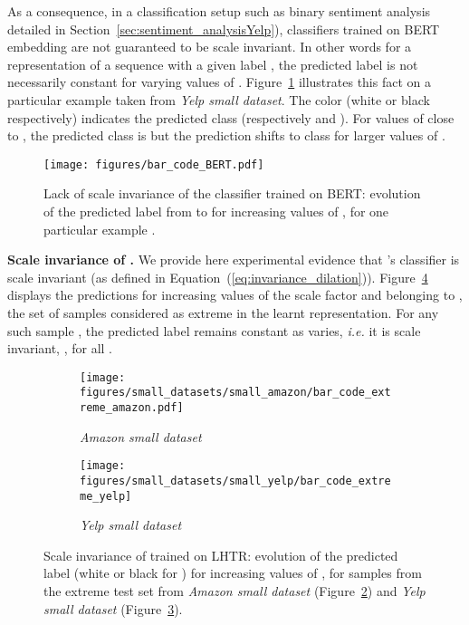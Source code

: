 As a consequence, 
in a classification setup such as binary sentiment analysis  detailed in Section~\ref{sec:sentiment_analysisYelp}), classifiers trained on BERT embedding are not guaranteed to be scale invariant. In other words for a representation  of a sequence  with a given label , the predicted label  is not necessarily constant for varying values of .
Figure~\ref{fig:barcode_bert} illustrates this fact on a particular example taken from \textit{Yelp small dataset}. The color (white or black respectively) indicates the predicted class (respectively  and ). For values of  close to , the predicted class is  but the prediction shifts to class   for larger values of . 
\begin{figure}[h]
    \centering
    \texttt{[image: figures/bar\_code\_BERT.pdf]}
    \caption{Lack of scale invariance of the classifier trained on BERT: evolution of the predicted label  from  to  for increasing values of , for one particular example .}
    \label{fig:barcode_bert}
\end{figure}{}

\textbf{Scale invariance of \HTalgo.} We provide here experimental evidence that \HTalgo's classifier  is scale invariant (as defined in Equation~(\ref{eq:invariance_dilation})). Figure~\ref{fig:barcodes_lhtr} displays the predictions  for increasing values of the scale factor   and  belonging to , the set of samples considered as extreme in the learnt representation. For any such sample ,
the predicted label remains constant as  varies, \emph{i.e.} it is  scale invariant, , for all . 
\begin{figure}[ht]
\centering
\begin{subfigure}[t]{0.45\textwidth}
    \texttt{[image: figures/small\_datasets/small\_amazon/bar\_code\_extreme\_amazon.pdf]}
    \caption{\textit{Amazon small dataset}}
    \label{fig:bar_code_amazon}
\end{subfigure}
\begin{subfigure}[t]{0.45\textwidth}
    \texttt{[image: figures/small\_datasets/small\_yelp/bar\_code\_extreme\_yelp]}
    \caption{\textit{Yelp small dataset}}
    \label{fig:bar_code_yelp}
\end{subfigure}
\caption{Scale invariance of  trained on LHTR: evolution of the predicted label    (white or black for ) for increasing values of , for samples  from the extreme test set  from \textit{Amazon small dataset} (Figure~\ref{fig:bar_code_amazon}) and  \textit{Yelp small dataset} (Figure~\ref{fig:bar_code_yelp})\label{fig:barcodes_lhtr}.}
\end{figure}

